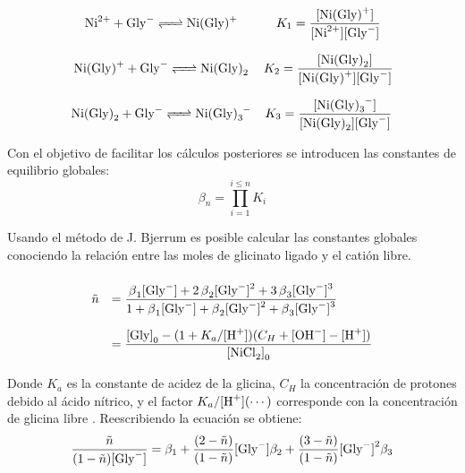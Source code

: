 \documentclass[fleqn,10pt]{SelfArx} %
\begin{document}
	\footnotesize
	\begin{equation*}
	\begin{array}{cc}
	\ce{Ni^{2+} + Gly- <=> Ni(Gly)+} & K_1 = \dfrac{\ce{[Ni(Gly)+]}}{\ce{[Ni^{2+}][Gly^-]}}\\
	\ce{Ni(Gly)+ + Gly- <=> Ni(Gly)_2} & K_2 = \dfrac{\ce{[Ni(Gly)_2]}}{\ce{[Ni(Gly)+][Gly^-]}}\\
	\ce{Ni(Gly)_2 + Gly- <=> Ni(Gly)_3-} & K_3 = \dfrac{\ce{[Ni(Gly)_3^-]}}{\ce{[Ni(Gly)_2][Gly^-]}}
	\end{array}
	\end{equation*}
	\normalsize
	
	Con el objetivo de facilitar los c\'alculos posteriores se introducen las constantes de equilibrio globales:
	\begin{equation}
	\beta_n = \prod\limits_{i=1}^{i \leq n} K_i
	\end{equation}
	
	Usando el m\'etodo de J. Bjerrum es posible calcular las constantes globales conociendo la relaci\'on entre las moles de glicinato ligado y el cati\'on libre.
	\small  
	\begin{equation}
	\def\arraystretch{3}
	\begin{array}{rl}
	\tilde{n} & = \dfrac{\ce{\beta_1[Gly^-] + 2\beta_2[Gly^-]^2 + 3\beta_3[Gly^-]^3}}{\ce{1 + \beta_1[Gly^-] + \beta_2[Gly^-]^2 + \beta_3[Gly^-]^3}} \\
	& = \dfrac{\ce{[Gly]}_0 - (1+K_a/\ce{[H+]})(C_H + \ce{[OH^-] - [H+]})}{\ce{[NiCl2]}_0}
	\end{array}
	\end{equation}
	\normalsize
	
	Donde $K_a$ es la constante de acidez de la glicina, $C_H$ la concentraci\'on de protones debido al \'acido n\'itrico, y el factor $K_a/\ce{[H+]}(\cdots)$ corresponde con la concentraci\'on de glicina libre \ce{[Gly^-]}. Reescribiendo la ecuaci\'on se obtiene:
	\footnotesize
	\begin{equation}
	\dfrac{\tilde{n}}{(1-\tilde{n})\ce{[Gly^-]}} = \beta_1 + \dfrac{(2-\tilde{n})}{(1-\tilde{n})}\ce{[Gly^-]}\beta_2 + \dfrac{(3-\tilde{n})}{(1-\tilde{n})}\ce{[Gly^-]}^2\beta_3
	\end{equation}
	\normalsize
	
\end{document}
